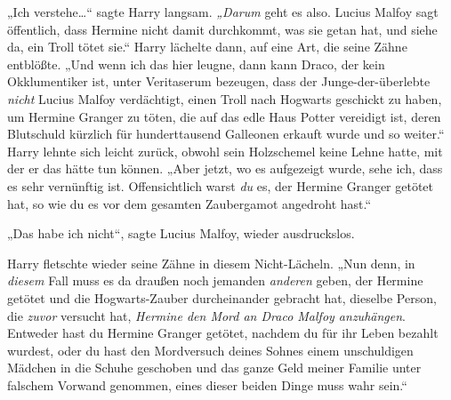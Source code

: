 „Ich verstehe…“ sagte Harry langsam. \emph{„Darum} geht es also. Lucius Malfoy sagt öffentlich, dass Hermine nicht damit durchkommt, was sie getan hat, und siehe da, ein Troll tötet sie.“ Harry lächelte dann, auf eine Art, die seine Zähne entblößte. „Und wenn ich das hier leugne, dann kann Draco, der kein Okklumentiker ist, unter Veritaserum bezeugen, dass der Junge-der-überlebte \emph{nicht} Lucius Malfoy verdächtigt, einen Troll nach Hogwarts geschickt zu haben, um Hermine Granger zu töten, die auf das edle Haus Potter vereidigt ist, deren Blutschuld kürzlich für hunderttausend Galleonen erkauft wurde und so weiter.“
Harry lehnte sich leicht zurück, obwohl sein Holzschemel keine Lehne hatte, mit der er das hätte tun können.
„Aber jetzt, wo es aufgezeigt wurde, sehe ich, dass es sehr vernünftig ist. Offensichtlich warst \emph{du} es, der Hermine Granger getötet hat, so wie du es vor dem gesamten Zaubergamot angedroht hast.“

„Das habe ich nicht“, sagte Lucius Malfoy, wieder ausdruckslos.

Harry fletschte wieder seine Zähne in diesem Nicht-Lächeln.
„Nun denn, in \emph{diesem} Fall muss es da draußen noch jemanden \emph{anderen} geben, der Hermine getötet und die Hogwarts-Zauber durcheinander gebracht hat, dieselbe Person, die \emph{zuvor} versucht hat, \emph{Hermine den Mord an Draco Malfoy anzuhängen}. Entweder hast du Hermine Granger getötet, nachdem du für ihr Leben bezahlt wurdest, oder du hast den Mordversuch deines Sohnes einem unschuldigen Mädchen in die Schuhe geschoben und das ganze Geld meiner Familie unter falschem Vorwand genommen, eines dieser beiden Dinge muss wahr sein.“


